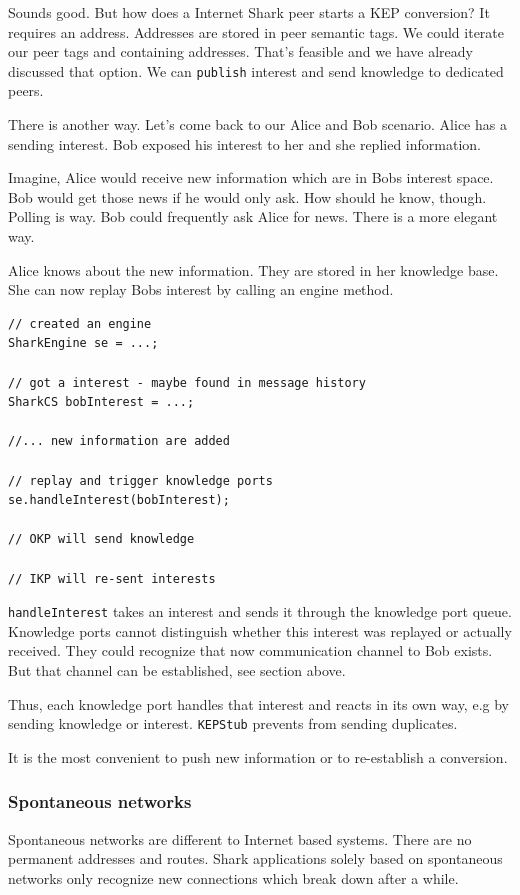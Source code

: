 Sounds good. But how does a Internet Shark peer starts a KEP conversion? It requires an address. Addresses are stored in peer semantic tags. We could iterate our peer tags and containing addresses. That's feasible and we have already discussed that option. We can {\tt publish} interest and send knowledge to dedicated peers. 

There is another way. Let's come back to our Alice and Bob scenario. Alice has a sending interest. Bob exposed his interest to her and she replied information.

Imagine, Alice would receive new information which are in Bobs interest space.
Bob would get those news if he would only ask. How should he know, though. Polling is way. Bob could frequently ask Alice for news. There is a more elegant way.

Alice knows about the new information. They are stored in her knowledge base. She can now replay Bobs interest by calling an engine method.

\begin{verbatim}
// created an engine
SharkEngine se = ...;

// got a interest - maybe found in message history
SharkCS bobInterest = ...;

//... new information are added

// replay and trigger knowledge ports
se.handleInterest(bobInterest);

// OKP will send knowledge

// IKP will re-sent interests
\end{verbatim}

{\tt handleInterest} takes an interest and sends it through the knowledge port queue. Knowledge ports cannot distinguish whether this interest was replayed or actually received. They could recognize that now communication channel to Bob exists. But that channel can be established, see section above.

Thus, each knowledge port handles that interest and reacts in its own way, e.g by sending knowledge or interest. {\tt KEPStub} prevents from sending duplicates. 

It is the most convenient to push new information or to re-establish a conversion.

\subsubsection{Spontaneous networks}
Spontaneous networks are different to Internet based systems. There are no permanent addresses and routes. Shark applications solely based on spontaneous networks only recognize new connections which break down after a while.

